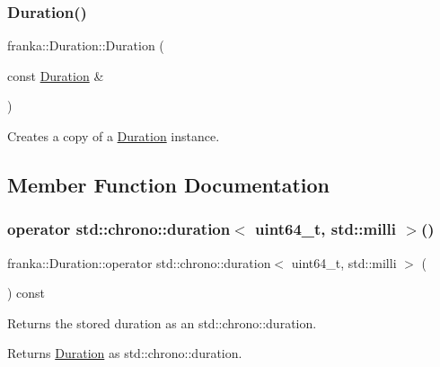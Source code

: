 \subsubsection{\texorpdfstring{Duration()}{Duration()}\hspace{0.1cm}{\footnotesize\ttfamily [4/4]}}
{\footnotesize\ttfamily franka\+::\+Duration\+::\+Duration (\begin{DoxyParamCaption}\item[{const \hyperlink{classfranka_1_1Duration}{Duration} \&}]{ }\end{DoxyParamCaption})\hspace{0.3cm}{\ttfamily [default]}}

Creates a copy of a \hyperlink{classfranka_1_1Duration}{Duration} instance. 

\subsection{Member Function Documentation}
\mbox{\label{classfranka_1_1Duration_ae58e283f511f9de8ac7e145db5cac1cf}} 
\subsubsection{\texorpdfstring{operator std\+::chrono\+::duration$<$ uint64\+\_\+t, std\+::milli $>$()}{operator std::chrono::duration< uint64\_t, std::milli >()}}
{\footnotesize\ttfamily franka\+::\+Duration\+::operator std\+::chrono\+::duration$<$ uint64\+\_\+t, std\+::milli $>$ (\begin{DoxyParamCaption}{ }\end{DoxyParamCaption}) const\hspace{0.3cm}{\ttfamily [noexcept]}}

Returns the stored duration as an std\+::chrono\+::duration.

\begin{DoxyReturn}{Returns}
\hyperlink{classfranka_1_1Duration}{Duration} as std\+::chrono\+::duration. 
\end{DoxyReturn}
\mbox{\label{classfranka_1_1Duration_a61603353e39361af2f405c1df7097e84}} 
